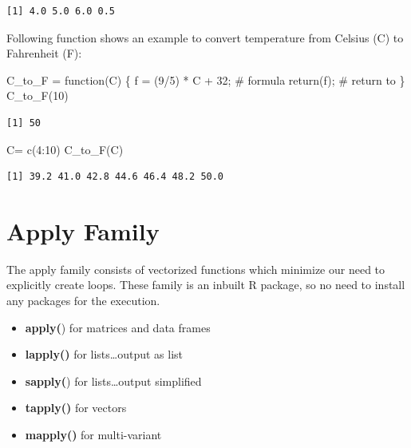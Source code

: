 \documentclass[
  letterpaper,
  DIV=11,
  numbers=noendperiod]{scrreprt}
\newenvironment{Shaded}{\begin{snugshade}}{\end{snugshade}}
\newcommand{\CommentTok}[1]{\textcolor[rgb]{0.37,0.37,0.37}{#1}}
\newcommand{\ControlFlowTok}[1]{\textcolor[rgb]{0.00,0.23,0.31}{#1}}
\newcommand{\DecValTok}[1]{\textcolor[rgb]{0.68,0.00,0.00}{#1}}
\newcommand{\FunctionTok}[1]{\textcolor[rgb]{0.28,0.35,0.67}{#1}}
\newcommand{\NormalTok}[1]{\textcolor[rgb]{0.00,0.23,0.31}{#1}}
\newcommand{\OtherTok}[1]{\textcolor[rgb]{0.00,0.23,0.31}{#1}}
\newcommand{\SpecialCharTok}[1]{\textcolor[rgb]{0.37,0.37,0.37}{#1}}
\begin{document}
\begin{verbatim}
[1] 4.0 5.0 6.0 0.5
\end{verbatim}

Following function shows an example to convert temperature from Celsius
(C) to Fahrenheit (F):

\begin{Shaded}
\begin{Highlighting}[]
\NormalTok{C\_to\_F }\OtherTok{=} \ControlFlowTok{function}\NormalTok{(C) \{}
\NormalTok{ f }\OtherTok{=}\NormalTok{ (}\DecValTok{9}\SpecialCharTok{/}\DecValTok{5}\NormalTok{) }\SpecialCharTok{*}\NormalTok{ C }\SpecialCharTok{+} \DecValTok{32}\NormalTok{; }\CommentTok{\# formula}
 \FunctionTok{return}\NormalTok{(f); }\CommentTok{\# return to}
\NormalTok{\}}
\FunctionTok{C\_to\_F}\NormalTok{(}\DecValTok{10}\NormalTok{)}
\end{Highlighting}
\end{Shaded}

\begin{verbatim}
[1] 50
\end{verbatim}

\begin{Shaded}
\begin{Highlighting}[]
\NormalTok{C}\OtherTok{=} \FunctionTok{c}\NormalTok{(}\DecValTok{4}\SpecialCharTok{:}\DecValTok{10}\NormalTok{)}
\FunctionTok{C\_to\_F}\NormalTok{(C)}
\end{Highlighting}
\end{Shaded}

\begin{verbatim}
[1] 39.2 41.0 42.8 44.6 46.4 48.2 50.0
\end{verbatim}

\hypertarget{apply-family}{%
\section{Apply Family}\label{apply-family}}

The apply family consists of vectorized functions which minimize our
need to explicitly create loops. These family is an inbuilt R package,
so no need to install any packages for the execution.

\begin{itemize}
\item
  \textbf{apply(}) for matrices and data frames
\item
  \textbf{lapply()} for lists\ldots output as list
\item
  \textbf{sapply(}) for lists\ldots output simplified
\item
  \textbf{tapply()} for vectors
\item
  \textbf{mapply()} for multi-variant
\end{itemize}
\end{document}
